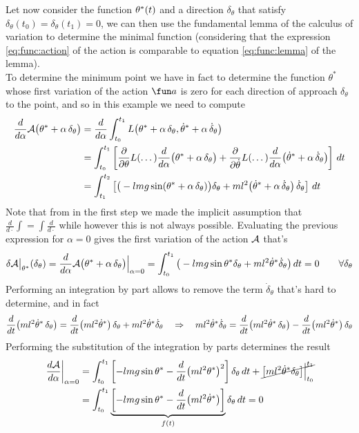 	Let now consider the function $\theta^*(t)$ and a direction $\delta_\theta$ that satisfy $\delta_\theta(t_0)=\delta_\theta(t_1) = 0$, we can then use the fundamental lemma of the calculus of variation to determine the minimal function (considering that the expression \ref{eq:func:action} of the action is comparable to equation \ref{eq:func:lemma} of the lemma).\\
	To determine the minimum point we have in fact to determine the function $\theta^*$ whose first variation of the action $\fun a$ is zero for each direction of approach $\delta_\theta$ to the point, and so in this example we need to compute
	\begin{align*}
		\frac{d}{d\alpha} \mathcal A\big(\theta^* + \alpha\, \delta_\theta\big) & = \frac{d}{d\alpha}\int_{t_0}^{t_1} L  \big( \theta ^* + \alpha\, \delta_\theta, \dot\theta^* + \alpha\, \dot \delta_\theta \big) \\
		& = \int_{t_0}^{t_1} \left[\frac{\partial }{\partial \theta} L ( \dots ) \frac{d}{d\alpha}\big(\theta^* + \alpha \,\delta_\theta\big) +\frac{\partial }{\partial \dot\theta} L  (\dots) \frac{d}{d\alpha}\big(\dot \theta^* + \alpha \,\dot \delta_\theta\big) \right]\, dt \\
		& = \int_{t_1}^{t_2} \left[ \big(-lmg\sin(\theta^* + \alpha\, \delta_\theta)\big)\delta_\theta + ml^2\big(
		\dot\theta^* + \alpha \, \dot\delta_\theta \big)\, \dot\delta_\theta \right] \, dt
	\end{align*}
	Note that from in the first step we made the implicit assumption that $ \frac d{d\cdot} \int = \int\frac{d}{d\cdot}$ while however this is not always possible. Evaluating the previous expression for $\alpha = 0$ gives the first variation of the action $\mathcal{A}$ that's
	\[  \delta \mathcal{A} \big|_{\theta^*}(\delta_\theta) = \frac{d}{d\alpha} \mathcal A\big(\theta^* + \alpha\, \delta_\theta\big) \Big|_{\alpha = 0} = \int_{t_0}^{t_1} \big(-lmg \sin\theta^*\delta_\theta + ml^2\dot\theta^* \dot\delta_\theta \big) \, dt = 0 \qquad \forall \delta_\theta \]
	Performing an integration by part allows to remove the term $\dot\delta_\theta$ that's hard to determine, and in fact
	\[ \frac{d}{dt}\big( ml^2\dot\theta^* \, \delta_\theta\big) = \frac{d}{dt}\big(ml^2\dot\theta^*\big)\,\delta_\theta + ml^2\dot\theta^* \dot\delta_\theta \quad \Rightarrow \quad ml^2\dot\theta^* \dot\delta_\theta = \frac{d}{dt}\big( ml^2\dot\theta^* \, \delta_\theta\big) - \frac{d}{dt}\big(ml^2\dot\theta^*\big)\,\delta_\theta \]
	Performing the substitution of the integration by parts determines the result
	\begin{align*}
		\left. \frac{d\mathcal A}{d\alpha}\right|_{\alpha = 0} & = \int_{t_0}^{t_1}  \left[ - lmg\sin\theta^* - \frac d{dt}\big(ml^2\theta^*\big)^2 \right]\delta_\theta\, dt + \cancel{\big[ ml^2 \dot\theta^* \delta_\theta \big]\Big|_{t_0}^{t_1} } \\
		& = \int_{t_0}^{t_1} \underbrace{\left[ -lmg \sin\theta^* - \frac d{dt}\big(ml^2 \dot\theta^*\big) \right]}_{f(t)} \delta_\theta\, dt = 0
	\end{align*}
